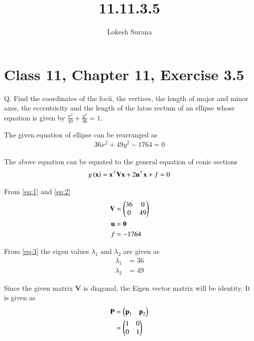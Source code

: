 \documentclass[journal,12pt,twocolumn]{IEEEtran}
\renewcommand{\vec}[1]{\boldsymbol{\mathbf{#1}}}
\begin{document}
\vspace{3cm}
\title{11.11.3.5}
\author{Lokesh Surana}
\maketitle
\section*{Class 11, Chapter 11, Exercise 3.5}
Q. Find the coordinates of the focii, the vertices, the length of major and minor axes, the eccentricity and the length of the latus rectum of an ellipse whose equation is given by $\frac{x^2}{49}+\frac{y^2}{36}=1$.

\solution The given equation of ellipse can be rearranged as
\begin{align}
    36x^2+49y^2-1764=0\label{eq:1}
\end{align}

The above equation can be equated to the general equation of conic sections
\begin{align}
 g\brak{\vec{x}}=\vec{x}^\top \vec{V} \vec{x} + 2\vec{u}^\top \vec{x} + f = 0\label{eq:2}
\end{align}

From \eqref{eq:1} and \eqref{eq:2}
\begin{align}
 \vec{V} &= \myvec{36&0\\0&49}\label{eq:3}\\
 \vec{u} &= \vec{0}\\
 f &= -1764
\end{align}

From \eqref{eq:3} the eigen values $\lambda_1 \text{ and } \lambda_2$ are given as
\begin{align}
 \lambda_1 &= 36\\
 \lambda_2 &= 49
\end{align}

Since the given matrix $\vec{V}$ is diagonal, the Eigen vector matrix will be identity. It is given as
\begin{align}
	\vec{P} &= \myvec{\vec{p}_1 & \vec{p}_2}\\
		&= \myvec{1&0\\0&1}
\end{align}
\end{document}
